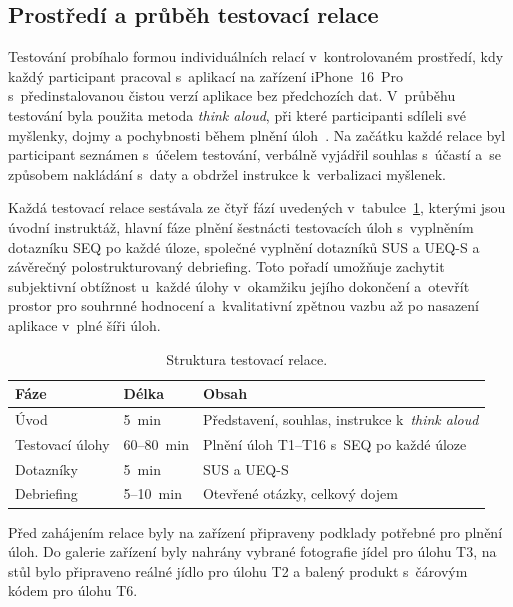\subsection{Prostředí a průběh testovací relace}
\label{subsec:prostrediRelace}

Testování probíhalo formou individuálních relací v~kontrolovaném prostředí, kdy každý participant pracoval s~aplikací na zařízení iPhone~16~Pro s~předinstalovanou čistou verzí aplikace bez předchozích dat.
V~průběhu testování byla použita metoda \emph{think aloud}, při které participanti sdíleli své myšlenky, dojmy a pochybnosti během plnění úloh~\cite{nielsen1994thinkAloud}.
Na začátku každé relace byl participant seznámen s~účelem testování, verbálně vyjádřil souhlas s~účastí a~se způsobem nakládání s~daty a obdržel instrukce k~verbalizaci myšlenek.

Každá testovací relace sestávala ze čtyř fází uvedených v~tabulce~\ref{tab:strukturaRelace}, kterými jsou úvodní instruktáž, hlavní fáze plnění šestnácti testovacích úloh s~vyplněním dotazníku SEQ po každé úloze, společné vyplnění dotazníků SUS a UEQ-S a závěrečný polostrukturovaný debriefing.
Toto pořadí umožňuje zachytit subjektivní obtížnost u~každé úlohy v~okamžiku jejího dokončení a~otevřít prostor pro souhrnné hodnocení a~kvalitativní zpětnou vazbu až po nasazení aplikace v~plné šíři úloh.

\begin{table}[ht]
	\centering
	\caption{Struktura testovací relace.}
	\label{tab:strukturaRelace}
	\setlength{\tabcolsep}{4pt}
	\begin{tabular}{lll}
		\toprule
		\textbf{Fáze} & \textbf{Délka} & \textbf{Obsah} \\
		\midrule
		Úvod & 5~min & Představení, souhlas, instrukce k~\emph{think aloud} \\
		Testovací úlohy & 60--80~min & Plnění úloh T1--T16 s~SEQ po každé úloze \\
		Dotazníky & 5~min & SUS a UEQ-S \\
		Debriefing & 5--10~min & Otevřené otázky, celkový dojem \\
		\bottomrule
	\end{tabular}
\end{table}

Před zahájením relace byly na zařízení připraveny podklady potřebné pro plnění úloh.
Do galerie zařízení byly nahrány vybrané fotografie jídel pro úlohu T3, na stůl bylo připraveno reálné jídlo pro úlohu T2 a balený produkt s~čárovým kódem pro úlohu T6.

